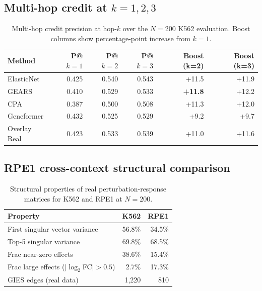 \documentclass{article}
\begin{document}
\subsection{Multi-hop credit at $k = 1, 2, 3$}

\begin{table}[h]
\centering
\small
\begin{tabular}{lrrrrr}
\toprule
\textbf{Method} & \textbf{P@$k{=}1$} & \textbf{P@$k{=}2$} & \textbf{P@$k{=}3$} & \textbf{Boost (k=2)} & \textbf{Boost (k=3)} \\
\midrule
ElasticNet  & 0.425 & 0.540 & 0.543 & +11.5 & +11.9 \\
GEARS       & 0.410 & 0.529 & 0.533 & \textbf{+11.8} & +12.2 \\
CPA         & 0.387 & 0.500 & 0.508 & +11.3 & +12.0 \\
Geneformer  & 0.432 & 0.525 & 0.529 & +9.2  & +9.7  \\
Overlay Real & 0.423 & 0.533 & 0.539 & +11.0 & +11.6 \\
\bottomrule
\end{tabular}
\caption{Multi-hop credit precision at hop-$k$ over the $N{=}200$ K562 evaluation. Boost columns show percentage-point increase from $k{=}1$.}
\end{table}

\subsection{RPE1 cross-context structural comparison}

\begin{table}[h]
\centering
\small
\begin{tabular}{lrr}
\toprule
\textbf{Property} & \textbf{K562} & \textbf{RPE1} \\
\midrule
First singular vector variance     & 56.8\% & 34.5\% \\
Top-5 singular variance            & 69.8\% & 68.5\% \\
Frac near-zero effects             & 38.6\% & 15.4\% \\
Frac large effects ($|\log_2$FC$|>0.5$) & 2.7\%  & 17.3\% \\
GIES edges (real data)             & 1{,}220 & 810 \\
\bottomrule
\end{tabular}
\caption{Structural properties of real perturbation-response matrices for K562 and RPE1 at $N{=}200$.}
\end{table}
\end{document}

